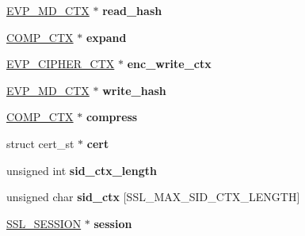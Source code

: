 \begin{DoxyCompactItemize}
\item 
\hypertarget{structssl__st_af550f07608665dad2b09a83c42ce494c}{}\hyperlink{structenv__md__ctx__st}{E\+V\+P\+\_\+\+M\+D\+\_\+\+C\+T\+X} $\ast$ {\bfseries read\+\_\+hash}\label{structssl__st_af550f07608665dad2b09a83c42ce494c}

\item 
\hypertarget{structssl__st_a01fd32f00c26a995e998b0ad8edb38cf}{}\hyperlink{structcomp__ctx__st}{C\+O\+M\+P\+\_\+\+C\+T\+X} $\ast$ {\bfseries expand}\label{structssl__st_a01fd32f00c26a995e998b0ad8edb38cf}

\item 
\hypertarget{structssl__st_a44444bb7794521afc2b9e52cd0c2570c}{}\hyperlink{structevp__cipher__ctx__st}{E\+V\+P\+\_\+\+C\+I\+P\+H\+E\+R\+\_\+\+C\+T\+X} $\ast$ {\bfseries enc\+\_\+write\+\_\+ctx}\label{structssl__st_a44444bb7794521afc2b9e52cd0c2570c}

\item 
\hypertarget{structssl__st_a491e1c0b9386b4003bb443af4a2d06d4}{}\hyperlink{structenv__md__ctx__st}{E\+V\+P\+\_\+\+M\+D\+\_\+\+C\+T\+X} $\ast$ {\bfseries write\+\_\+hash}\label{structssl__st_a491e1c0b9386b4003bb443af4a2d06d4}

\item 
\hypertarget{structssl__st_a62a49a9330502d045bbf6376c820225c}{}\hyperlink{structcomp__ctx__st}{C\+O\+M\+P\+\_\+\+C\+T\+X} $\ast$ {\bfseries compress}\label{structssl__st_a62a49a9330502d045bbf6376c820225c}

\item 
\hypertarget{structssl__st_a335d212e807952601a0eabf4dfd978eb}{}struct cert\+\_\+st $\ast$ {\bfseries cert}\label{structssl__st_a335d212e807952601a0eabf4dfd978eb}

\item 
\hypertarget{structssl__st_a7b63f375f11b5232a5dff69e26f6a438}{}unsigned int {\bfseries sid\+\_\+ctx\+\_\+length}\label{structssl__st_a7b63f375f11b5232a5dff69e26f6a438}

\item 
\hypertarget{structssl__st_a486ddbf462473285440234c69568b9ce}{}unsigned char {\bfseries sid\+\_\+ctx} \mbox{[}S\+S\+L\+\_\+\+M\+A\+X\+\_\+\+S\+I\+D\+\_\+\+C\+T\+X\+\_\+\+L\+E\+N\+G\+T\+H\mbox{]}\label{structssl__st_a486ddbf462473285440234c69568b9ce}

\item 
\hypertarget{structssl__st_ae6d956c10b03dd3f4d0a3a132466eb47}{}\hyperlink{structssl__session__st}{S\+S\+L\+\_\+\+S\+E\+S\+S\+I\+O\+N} $\ast$ {\bfseries session}\label{structssl__st_ae6d956c10b03dd3f4d0a3a132466eb47}


\end{DoxyCompactItemize}
